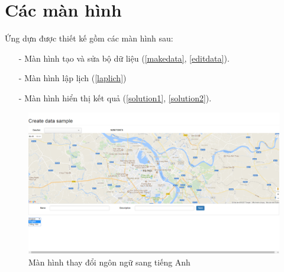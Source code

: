 \documentclass[a4paper,12pt]{report}
\begin{document}
\section{Các màn hình}
Ứng dựn được thiết kế gồm các màn hình sau: 
\begin{itemize}
\item[-] Màn hình tạo và sửa bộ dữ liệu (\ref{makedata}, \ref{editdata}).
\item[-] Màn hình lập lịch (\ref{laplich})
\item[-] Màn hình hiển thị kết quả (\ref{solution1}, \ref{solution2}).
\end{itemize}
\begin{figure}

\includegraphics[scale=0.41]{screen/changeLanguage.png}
\caption{Màn hình thay đổi ngôn ngữ sang tiếng Anh}
\label{changelanguage}
\end{figure}
\end{document}
